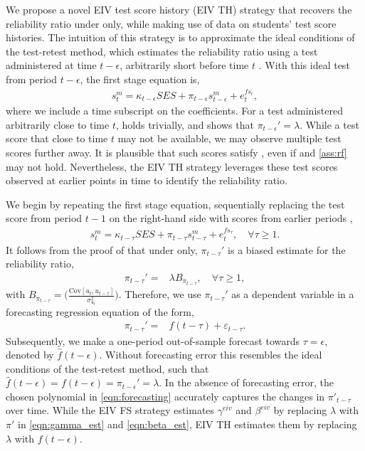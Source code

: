 We propose a novel EIV test score history (EIV TH) strategy that recovers the reliability ratio under  only, while making use of data on students' test score histories. The intuition of this strategy is to approximate the ideal conditions of the test-retest method, which estimates the reliability ratio using a test administered at time $t-\epsilon$, arbitrarily short before time $t$ \citep{Cito2017}. With this ideal test from period $t-\epsilon$, the first stage equation is,
\begin{align}
    s_{t}^m=\kappa_{t-\epsilon}SES +\pi_{t-\epsilon} s_{t-\epsilon}^m+e_t^{fs_{\epsilon}},
\end{align}
where we include a time subscript on the coefficients. For a test administered arbitrarily close to time $t$,  holds trivially, and  shows that $\pi_{t-\epsilon}'= \lambda$. While a test score that close to time $t$  may not be available, we may observe multiple test scores further away. It is plausible that such scores satisfy , even if  and \ref{ass:rf} may not hold. Nevertheless, the EIV TH strategy leverages these test scores observed at earlier points in time to identify the reliability ratio.

We begin by repeating the first stage equation, sequentially replacing the test score from period $t-1$ on the right-hand side with scores from earlier periods ,
\begin{align}\label{eqn:fs_tau}
    s_{t}^m= \kappa_{t-\tau}SES + \pi_{t-\tau} s_{t-\tau}^m+e_t^{fs_{\tau}}, \quad \forall \tau \geq 1.
\end{align}
It follows from  the proof of  that under  only, $\pi_{t-\tau}'$ is a biased estimate for the reliability ratio,
\begin{align}
   \pi_{t-\tau}'=& \lambda B_{\pi_{t-\tau}}, \quad \forall \tau \geq 1,
\end{align}
with $B_{\pi_{t-\tau}}=\Bigg( \frac{\mathrm{Cov}[u_{t},u_{t-\tau}]}{\sigma_{u_{t}}^2}\Bigg)$. Therefore, we use $\pi_{t-\tau}'$ as a dependent variable in a forecasting regression equation of the form,
\begin{align}\label{eqn:forecasting}
    \pi_{t-\tau}'=& f(t-\tau)+\varepsilon_{t-\tau}. 
\end{align}
Subsequently, we make a one-period out-of-sample forecast towards $\tau=\epsilon$, denoted by $ \widehat{f}(t-\epsilon)$. Without forecasting error this resembles the ideal conditions of the test-retest method, such that $\widehat{f}(t-\epsilon)={f}(t-\epsilon)= \pi_{t-\epsilon}'=\lambda$. 
In the absence of forecasting error, the chosen polynomial in \eqref{eqn:forecasting} accurately captures the changes in $\pi'_{t-\tau}$ over time. While the EIV FS strategy estimates $\gamma^{eiv}$ and $\beta^{eiv}$ by replacing $\lambda$ with $\pi'$ in \eqref{eqn:gamma_est} and \eqref{eqn:beta_est}, EIV TH estimates them by replacing $\lambda$ with ${f}(t-\epsilon)$.

